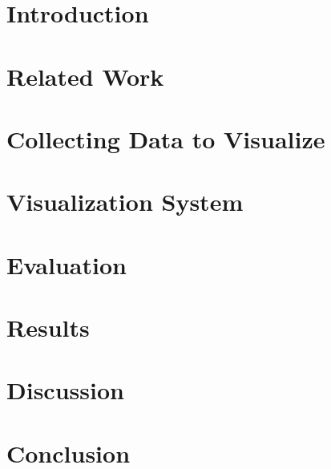 \documentclass[conference]{IEEEtran}
\begin{document}
\section{Introduction}


\section{Related Work}

\section{Collecting Data to Visualize}


\section{Visualization System}

\section{Evaluation}

\section{Results}

\section{Discussion}

\section{Conclusion}
\end{document}
